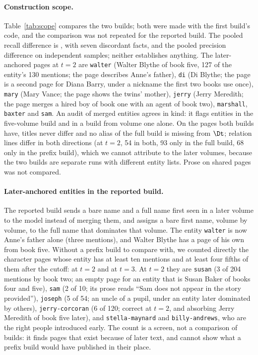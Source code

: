 \paragraph{Construction scope.}
Table~\ref{tab:scope} compares the two builds; both were made with the first build's code, and
the comparison was not repeated for the reported build. The pooled recall difference is ,
with seven discordant facts, and the pooled precision difference  on independent
samples; neither establishes anything. The later-anchored pages at $t=2$ are \texttt{walter}
(Walter Blythe of book five, 127 of the entity's 130 mentions; the page describes Anne's
father), \texttt{di} (Di Blythe; the page is a second page for Diana Barry, under a nickname
the first two books use once), \texttt{mary} (Mary Vance; the page shows the twins' mother),
\texttt{jerry} (Jerry Meredith; the page merges a hired boy of book one with an agent of book
two), \texttt{marshall}, \texttt{baxter} and \texttt{sam}. An audit of merged entities agrees
in kind: it flags  entities in the five-volume build and
 in a build from volume one alone. On the pages both builds have, titles
never differ and no alias of the full build is missing from $\Dt$; relation lines differ in
both directions (at $t=2$, 54 in both, 93 only in the full build, 68 only in the prefix
build), which we cannot attribute to the later volumes, because the two builds are separate
runs with different entity lists. Prose on shared pages was not compared.

\paragraph{Later-anchored entities in the reported build.}
The reported build sends a bare name and a full name first seen in a later volume to the
model instead of merging them, and assigns a bare first name, volume by volume, to the full
name that dominates that volume. The entity \texttt{walter} is now Anne's father alone (three
mentions), and Walter Blythe has a page of his own from book five. Without a prefix build to
compare with, we counted directly the character pages
whose entity has at least ten mentions and at least four fifths of them after the cutoff:
 at $t=2$ and  at $t=3$. At $t=2$ they are
\texttt{susan} (3 of 204 mentions by book two; an empty page for an entity that is Susan
Baker of books four and five), \texttt{sam} (2 of 10; its prose reads ``Sam does not appear
in the story provided''), \texttt{joseph} (5 of 54; an uncle of a pupil, under an entity
later dominated by others), \texttt{jerry-corcoran} (6 of 120; correct at $t=2$, and
absorbing Jerry Meredith of book five later), and \texttt{stella-maynard} and
\texttt{billy-andrews}, who are the right people introduced early. The count is a screen,
not a comparison of builds: it finds pages that exist because of later text, and cannot show
what a prefix build would have published in their place.

